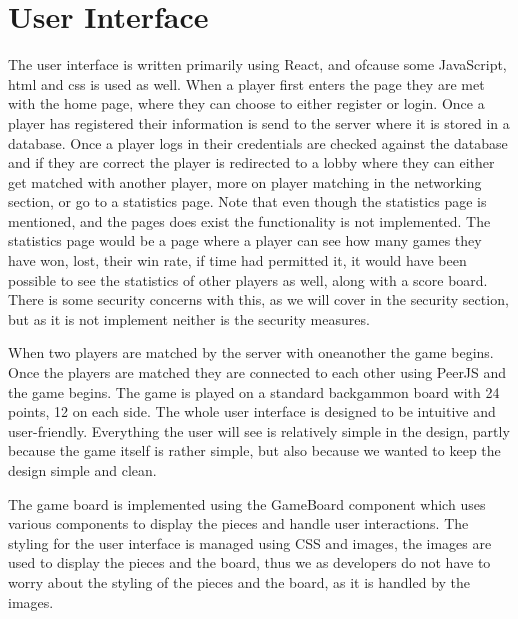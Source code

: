 \documentclass[ twoside,openright,titlepage,numbers=noenddot,headinclude,%
                footinclude=true,cleardoublepage=empty,abstractoff, %
                BCOR=5mm,paper=a4,fontsize=11pt,%
                ngerman,american,%
                ]{scrreprt}
\begin{document}
\section{User Interface}
The user interface is written primarily using React, and ofcause some JavaScript, html and css is used as well. When a player first enters the page they are met with the home page, where they can choose to either register or login. Once a player has registered their information is send to the server where it is stored in a database. Once a player logs in their credentials are checked against the database and if they are correct the player is redirected to a lobby where they can either get matched with another player, more on player matching in the networking section, or go to a statistics page. Note that even though the statistics page is mentioned, and the pages does exist the functionality is not implemented. The statistics page would be a page where a player can see how many games they have won, lost, their win rate, if time had permitted it, it would have been possible to see the statistics of other players as well, along with a score board. There is some security concerns with this, as we will cover in the security section, but as it is not implement neither is the security measures. 

When two players are matched by the server with oneanother the game begins. Once the players are matched they are connected to each other using PeerJS and the game begins.
The game is played on a standard backgammon board with 24 points, 12 on each side. The whole user interface is designed to be intuitive and user-friendly. Everything the user will see is relatively simple in the design, partly because the game itself is rather simple, but also because we wanted to keep the design simple and clean. 

The game board is implemented using the GameBoard component which uses various components to display the pieces and handle user interactions. The styling for the user interface is managed using CSS and images, the images are used to display the pieces and the board, thus we as developers do not have to worry about the styling of the pieces and the board, as it is handled by the images.  
\end{document}
